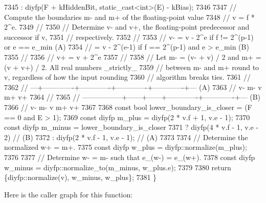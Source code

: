 \begin{DoxyCode}
7345                     : diyfp(F + kHiddenBit, static\_cast<int>(E) - kBias);
7346 
7347     \textcolor{comment}{// Compute the boundaries m- and m+ of the floating-point value}
7348     \textcolor{comment}{// v = f * 2^e.}
7349     \textcolor{comment}{//}
7350     \textcolor{comment}{// Determine v- and v+, the floating-point predecessor and successor if v,}
7351     \textcolor{comment}{// respectively.}
7352     \textcolor{comment}{//}
7353     \textcolor{comment}{//      v- = v - 2^e        if f != 2^(p-1) or e == e\_min                (A)}
7354     \textcolor{comment}{//         = v - 2^(e-1)    if f == 2^(p-1) and e > e\_min                (B)}
7355     \textcolor{comment}{//}
7356     \textcolor{comment}{//      v+ = v + 2^e}
7357     \textcolor{comment}{//}
7358     \textcolor{comment}{// Let m- = (v- + v) / 2 and m+ = (v + v+) / 2. All real numbers \_strictly\_}
7359     \textcolor{comment}{// between m- and m+ round to v, regardless of how the input rounding}
7360     \textcolor{comment}{// algorithm breaks ties.}
7361     \textcolor{comment}{//}
7362     \textcolor{comment}{//      ---+-------------+-------------+-------------+-------------+---  (A)}
7363     \textcolor{comment}{//         v-            m-            v             m+            v+}
7364     \textcolor{comment}{//}
7365     \textcolor{comment}{//      -----------------+------+------+-------------+-------------+---  (B)}
7366     \textcolor{comment}{//                       v-     m-     v             m+            v+}
7367 
7368     \textcolor{keyword}{const} \textcolor{keywordtype}{bool} lower\_boundary\_is\_closer = (F == 0 and E > 1);
7369     \textcolor{keyword}{const} diyfp m\_plus = diyfp(2 * v.f + 1, v.e - 1);
7370     \textcolor{keyword}{const} diyfp m\_minus = lower\_boundary\_is\_closer
7371                           ? diyfp(4 * v.f - 1, v.e - 2)  \textcolor{comment}{// (B)}
7372                           : diyfp(2 * v.f - 1, v.e - 1); \textcolor{comment}{// (A)}
7373 
7374     \textcolor{comment}{// Determine the normalized w+ = m+.}
7375     \textcolor{keyword}{const} diyfp w\_plus = diyfp::normalize(m\_plus);
7376 
7377     \textcolor{comment}{// Determine w- = m- such that e\_(w-) = e\_(w+).}
7378     \textcolor{keyword}{const} diyfp w\_minus = diyfp::normalize\_to(m\_minus, w\_plus.e);
7379 
7380     \textcolor{keywordflow}{return} \{diyfp::normalize(v), w\_minus, w\_plus\};
7381 \}
\end{DoxyCode}
Here is the caller graph for this function\+:
\mbox{\label{namespacenlohmann_1_1detail_1_1dtoa__impl_a264df2b5a7e19b864859161f3501155e}} 
